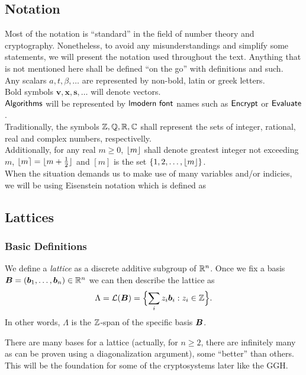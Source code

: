 \subsection{Notation}
Most of the notation is ``standard'' in the field of number theory and cryptography. Nonetheless, to avoid any misunderstandings and simplify some statements, we will present the notation used throughout the text. Anything that is not mentioned here shall be defined ``on the go'' with definitions and such. \\

\noindent Any scalars $a, t, \beta, \dots$ are represented by non-bold, latin or greek letters.\\
Bold symbols $\bm{v}, \bm{x}, \bm{s}, \dots$ will denote vectors. \\
$\alg{Algorithms}$ will be represented by $\alg{lmodern font}$ names such as $\alg{Encrypt}$ or $\alg{Evaluate}$.\\
Traditionally, the symbols $\mathbb{Z}, \mathbb{Q}, \mathbb{R}, \mathbb{C}$ shall represent the sets of integer, rational, real and complex numbers, respectivelly.\\
Additionally, for any real $m \geq 0$, $\lfloor m \rfloor$ shall denote greatest integer not exceeding $m$, $\lfloor m \rceil = \lfloor m + \frac{1}{2} \rfloor$ and $[m]$ is the set $\{1, 2, \dots, \lfloor m \rfloor\}$.\\
When the situation demands us to make use of many variables and/or indicies, we will be using Eisenstein notation which is defined as 

\subsection{Lattices}
\subsubsection*{Basic Definitions}
We define a \textit{lattice} as a discrete additive subgroup of $\mathbb{R}^n$. Once we fix a basis $\boldsymbol{B} = (\boldsymbol{b}_1, \dots ,\boldsymbol{b}_n) \in \mathbb{R}^n$ we can then describe the lattice as
\[ \Lambda = \mathcal{L}(\boldsymbol{B}) = \Bigl\{ \sum_i z_i \boldsymbol{b}_i : z_i \in \mathbb{Z} \Bigl\}.\]
In other words, $\Lambda$ is the $\mathbb{Z}$-span of the specific basis $\boldsymbol{B}$.

There are many bases for a lattice (actually, for $n \geq 2$, there are infinitely many as can be proven using a diagonalization argument), some ``better'' than others. This will be the foundation for some of the cryptosystems later like the GGH.


